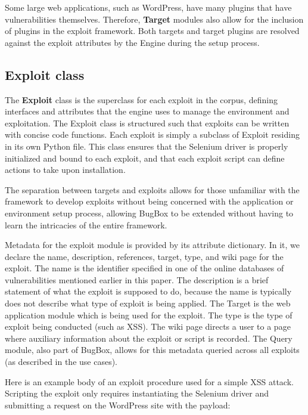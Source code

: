 \documentclass[letterpaper,twocolumn,10pt]{article}
\begin{document}
Some large web applications, such as WordPress, have many plugins that have vulnerabilities themselves. Therefore, {\bf Target} modules also allow for the inclusion of plugins in the exploit framework. Both targets and target plugins are resolved against the exploit attributes by the Engine during the setup process. 


\subsection{Exploit class}
The {\bf Exploit} class is the superclass for each exploit in the corpus, defining interfaces and attributes that the engine uses to manage the environment and exploitation. The Exploit class is structured such that exploits can be written with concise code functions. Each exploit is simply a subclass of Exploit residing in its own Python file. This class ensures that the Selenium driver is properly initialized and bound to each exploit, and that each exploit script can define actions to take upon installation.

The separation between targets and exploits allows for those unfamiliar with the framework to develop exploits without being concerned with the application or environment setup process, allowing BugBox to be extended without having to learn the intricacies of the entire framework.\par
 
Metadata for the exploit module is provided by its attribute dictionary. In it, we declare the name, description, references, target, type, and wiki page for the exploit. The name is the identifier specified in one of the online databases of vulnerabilities mentioned earlier in this paper. The description is a brief statement of what the exploit is supposed to do, because the name is typically does not describe what type of exploit is being applied. The Target is the web application module which is being used for the exploit. The type is the type of exploit being conducted (such as XSS). The wiki page directs a user to a page where auxiliary information about the exploit or script is recorded. The Query module, also part of BugBox, allows for this metadata queried across all exploits (as described in the use cases).

Here is an example body of an exploit procedure used for a simple XSS attack. Scripting the exploit only requires instantiating the Selenium driver and submitting a request on the WordPress site with the payload: 
\end{document}
